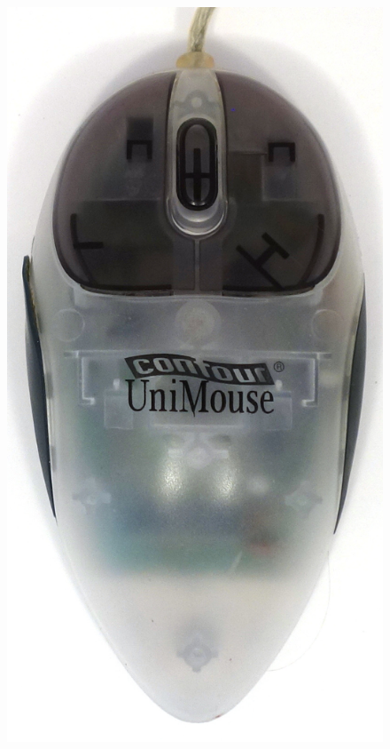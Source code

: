 \documentclass[11pt, a4paper]{article}
\begin{document}
\begin{figure}[h]
    \centering
    \includegraphics[scale=0.48]{1999_contour_unimouse/top_30.jpg}

\end{figure}
\end{document}

